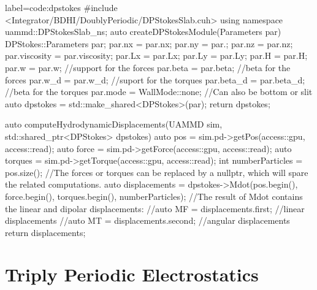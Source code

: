 \documentclass[ twoside,openright,titlepage,numbers=noenddot,%
headinclude,footinclude,cleardoublepage=empty,abstract=on,
BCOR=5mm,paper=a4,fontsize=11pt, dvipsnames
]{scrreprt}
\begin{document}
\begin{code2}{label=code:dpstokes}
#include <Integrator/BDHI/DoublyPeriodic/DPStokesSlab.cuh>
using namespace uammd::DPStokesSlab_ns;  
auto createDPStokesModule(Parameters par){
  DPStokes::Parameters par;
  par.nx         = par.nx;
  par.ny         = par.;
  par.nz	 = par.nz;
  par.viscosity	 = par.viscosity;
  par.Lx	 = par.Lx;
  par.Ly	 = par.Ly;
  par.H		 = par.H;
  par.w = par.w; //support for the forces
  par.beta = par.beta; //beta for the forces
  par.w_d = par.w_d; //suport for the torques
  par.beta_d = par.beta_d; //beta for the torques
  par.mode = WallMode::none; //Can also be bottom or slit
  auto dpstokes = std::make_shared<DPStokes>(par);
  return dpstokes;
}

auto computeHydrodynamicDisplacements(UAMMD sim, std::shared_ptr<DPStokes> dpstokes){
  auto pos = sim.pd->getPos(access::gpu, access::read);
  auto force = sim.pd->getForce(access::gpu, access::read);
  auto torques = sim.pd->getTorque(access::gpu, access::read);
  int numberParticles = pos.size();
  //The forces or torques can be replaced by a nullptr, which will spare the related computations.
  auto displacements = dpstokes->Mdot(pos.begin(), force.begin(), torques.begin(), numberParticles);
  //The result of Mdot contains the linear and dipolar displacements:
  //auto MF = displacements.first; //linear displacements
  //auto MT = displacements.second; //angular displacements
  return displacements;
}

\end{code2}

\chapter{Triply Periodic Electrostatics} \label{ch:tppoisson}
\end{document}

